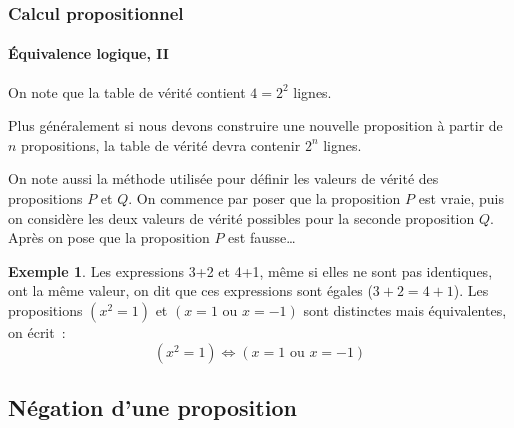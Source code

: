 \documentclass[10pt,notheorems]{beamer}
\theoremstyle{plain}
\theoremstyle{definition} %
\newtheorem{example}{Exemple}
\begin{document}
\begin{frame}
  \frametitle{Calcul propositionnel}
  \framesubtitle{Équivalence logique, II}
  \hypertarget{slide_equivalence_logique_2}{}

  On note que la table de vérité contient $4 = 2^{2}$ lignes.\newline

  Plus généralement si nous devons construire une nouvelle proposition
  à partir de $n$ propositions, la table de vérité devra contenir
  $2^{n}$ lignes.\newline

  On note aussi la méthode utilisée pour définir les valeurs de vérité
  des propositions $P$ et $Q$. On commence par poser que la
  proposition $P$ est vraie, puis on considère les deux valeurs de
  vérité possibles pour la seconde proposition $Q$. Après on pose que
  la proposition $P$ est fausse\ldots

    \begin{example}
      Les expressions 3+2 et 4+1, même si elles ne sont pas
      identiques, ont la même valeur, on dit que ces expressions sont
      égales ($3+2=4+1$). Les propositions $(x^{2} = 1)$ et
      $(x=1\text{ ou }x=-1)$ sont distinctes mais équivalentes, on
      écrit~:
      \[
        (x^{2} = 1) \Leftrightarrow (x=1\text{ ou }x=-1)
      \]
    \end{example}

  \end{frame}

  \subsection{Négation d'une proposition}
\end{document}
